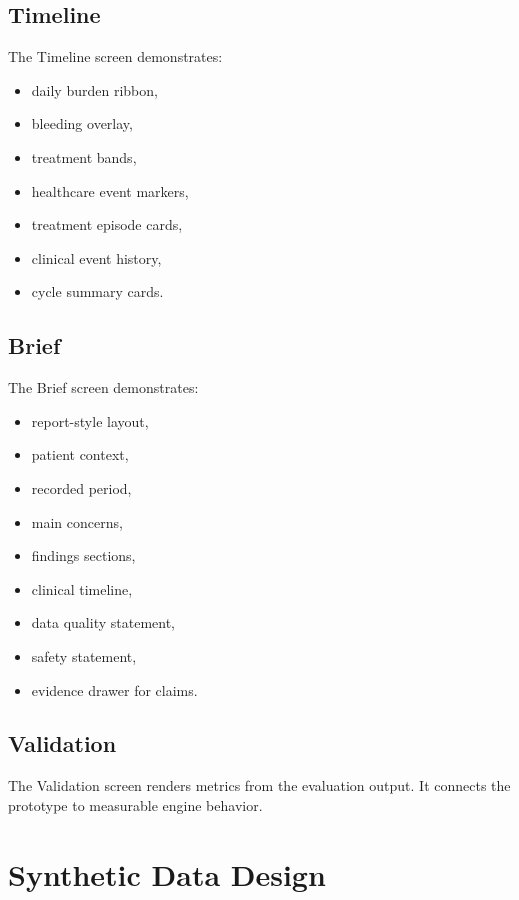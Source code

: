 \documentclass[11pt,a4paper]{article}
\begin{document}
\subsection{Timeline}

The Timeline screen demonstrates:

\begin{itemize}
  \item daily burden ribbon,
  \item bleeding overlay,
  \item treatment bands,
  \item healthcare event markers,
  \item treatment episode cards,
  \item clinical event history,
  \item cycle summary cards.
\end{itemize}

\subsection{Brief}

The Brief screen demonstrates:

\begin{itemize}
  \item report-style layout,
  \item patient context,
  \item recorded period,
  \item main concerns,
  \item findings sections,
  \item clinical timeline,
  \item data quality statement,
  \item safety statement,
  \item evidence drawer for claims.
\end{itemize}

\subsection{Validation}

The Validation screen renders metrics from the evaluation output. It connects the prototype to measurable engine behavior.

\section{Synthetic Data Design}
\end{document}
